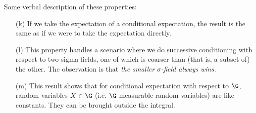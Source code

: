 \documentclass{article} %
\begin{document}
\begin{remark}
Some verbal description of these properties:
\begin{itemize}
\item[(k)] If we take the expectation of a conditional expectation, the result is the same as if we were to take the expectation directly. 
\item[(l)] This property handles a scenario where we do successive conditioning with respect to two sigma-fields, one of which is coarser than (that is, a subset of) the other.  The observation is that \textit{the smaller $\sigma$-field always wins.}
\item[(m)] This result shows that for conditional expectation with respect to $\G$, random variables $X \in \G$ (i.e. $\G$-measurable random variables) are like constants. They can be brought outside the integral.
\end{itemize}	
\end{remark}
\end{document}
